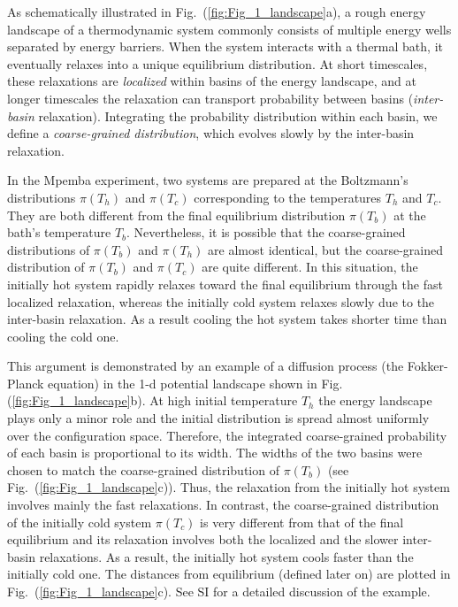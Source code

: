 \documentclass[a4paper,draft,aps,prl,preprint,superscriptaddress,nofootinbib]{revtex4}
\begin{document}
		
		
		As schematically illustrated in Fig.~(\ref{fig:Fig_1_landscape}a), a rough energy landscape of a thermodynamic system commonly consists of multiple energy wells separated by energy barriers. When the system interacts with a thermal bath, it eventually relaxes into a unique equilibrium distribution. At short timescales, these relaxations are \emph{localized} within basins of the energy landscape, and at longer timescales the relaxation can transport probability between basins ({\it inter-basin} relaxation). Integrating the probability distribution within each basin, we define a {\it coarse-grained distribution}, which evolves slowly by the inter-basin relaxation.		
		
		In the Mpemba experiment, two systems are prepared at the Boltzmann's distributions $\pi(T_h)$ and $\pi(T_c)$ corresponding to the  temperatures $T_h$ and $T_c$. They are both different from the final equilibrium distribution $\pi(T_b)$ at the bath's temperature $T_b$. Nevertheless, it is possible that the coarse-grained distributions of $\pi(T_b)$ and $\pi(T_h)$ are almost identical, but the coarse-grained distribution of $\pi(T_b)$ and $\pi(T_c)$ are quite different. In this situation, the initially hot system rapidly relaxes toward the final equilibrium through the fast localized relaxation, whereas the initially cold system relaxes slowly due to the inter-basin relaxation. As a result cooling the hot system takes shorter time than cooling the  cold one.	
				
		This argument is demonstrated by an example of a diffusion process (the Fokker-Planck equation) in the 1-d potential landscape shown in Fig. (\ref{fig:Fig_1_landscape}b).  At high initial temperature $T_h$ the energy landscape plays only a minor role and the initial distribution is spread almost uniformly over the configuration space. Therefore, the integrated coarse-grained probability of each basin is proportional to its width. The widths of the two basins were chosen to match the coarse-grained distribution of $\pi(T_b)$ (see Fig.~(\ref{fig:Fig_1_landscape}c)). Thus, the relaxation from the initially hot system involves mainly the fast relaxations. In contrast, the coarse-grained distribution of the initially cold system $\pi(T_c)$ is very different from that of the final equilibrium and its relaxation involves both the localized and the slower inter-basin relaxations. As a result, the initially hot system cools faster than the initially cold one. The distances from equilibrium (defined later on) are plotted in Fig.~(\ref{fig:Fig_1_landscape}c). See SI for a detailed discussion of the example.
	
\end{document}
